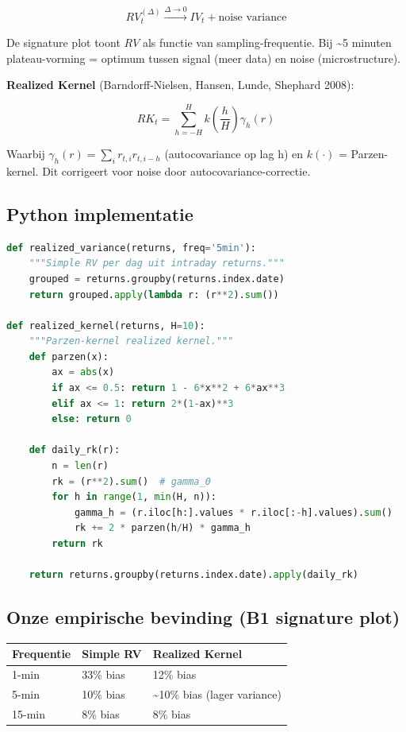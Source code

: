 \documentclass[11pt,a4paper]{article}
\begin{document}
\[RV_t^{(\Delta)} \xrightarrow{\Delta \to 0} IV_t + \text{noise variance}\]

De signature plot toont \(RV\) als functie van sampling-frequentie. Bij \textasciitilde5 minuten plateau-vorming = optimum tussen signal (meer data) en noise (microstructure).

\textbf{Realized Kernel} (Barndorff-Nielsen, Hansen, Lunde, Shephard 2008):

\[RK_t = \sum_{h=-H}^{H} k\left(\frac{h}{H}\right) \gamma_h(r)\]

Waarbij \(\gamma_h(r) = \sum_i r_{t,i} r_{t,i-h}\) (autocovariance op lag h) en \(k(\cdot)\) = Parzen-kernel. Dit corrigeert voor noise door autocovariance-correctie.

\hypertarget{python-implementatie}{%
\subsection{Python implementatie}\label{python-implementatie}}

\begin{lstlisting}[language=Python]
def realized_variance(returns, freq='5min'):
    """Simple RV per dag uit intraday returns."""
    grouped = returns.groupby(returns.index.date)
    return grouped.apply(lambda r: (r**2).sum())

def realized_kernel(returns, H=10):
    """Parzen-kernel realized kernel."""
    def parzen(x):
        ax = abs(x)
        if ax <= 0.5: return 1 - 6*x**2 + 6*ax**3
        elif ax <= 1: return 2*(1-ax)**3
        else: return 0
    
    def daily_rk(r):
        n = len(r)
        rk = (r**2).sum()  # gamma_0
        for h in range(1, min(H, n)):
            gamma_h = (r.iloc[h:].values * r.iloc[:-h].values).sum()
            rk += 2 * parzen(h/H) * gamma_h
        return rk
    
    return returns.groupby(returns.index.date).apply(daily_rk)
\end{lstlisting}

\hypertarget{onze-empirische-bevinding-b1-signature-plot}{%
\subsection{Onze empirische bevinding (B1 signature plot)}\label{onze-empirische-bevinding-b1-signature-plot}}

\begin{longtable}[]{@{}lll@{}}
\toprule
Frequentie & Simple RV & Realized Kernel \\
\midrule
\endhead
1-min & 33\% bias & 12\% bias \\
5-min & 10\% bias & \textasciitilde10\% bias (lager variance) \\
15-min & 8\% bias & 8\% bias \\
\bottomrule
\end{longtable}
\end{document}
